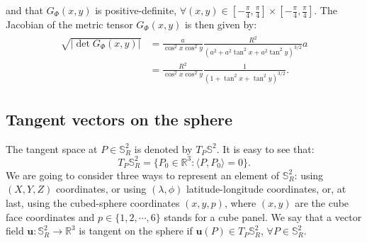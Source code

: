 and that $G_{\Phi}(x,y)$ is positive-definite, 
$\forall (x,y) \in [-\frac{\pi}{4},\frac{\pi}{4}] 
\times [-\frac{\pi}{4},\frac{\pi}{4}]$.
The Jacobian of the metric tensor $G_{\Phi}(x,y)$ is then given by:
\begin{align}
	\label{metrictensor-cs-equiangular}
	\begin{split}
		\sqrt{|\det{G_{\Phi}(x,y)}|} &= \frac{a}{\cos^2 x \cos^2 y}
		\frac{R^2}{(a^2 + a^2\tan^2x + a^2\tan^2y)^{3/2}}a\\
		&= \frac{R^2}{\cos^2 x \cos^2 y}
		\frac{1}{(1 + \tan^2x + \tan^2y)^{3/2}}.
	\end{split}
\end{align}

\subsection{Tangent vectors on the sphere}
\label{cs-tgvectors}
The tangent space at $P \in \mathbb{S}^2_R$ is denoted by $T_P \mathbb{S}^2$.
It is easy to see that:
\begin{equation*}
	T_P\mathbb{S}^2_R = \{P_0 \in \mathbb{R}^3: \langle P,P_0\rangle = 0\}.
\end{equation*}
We are going to consider three ways to represent an element of $\mathbb{S}_R^2$:
using $(X,Y,Z)$ coordinates, or using $(\lambda, \phi)$
latitude-longitude coordinates, or, at last, using the cubed-sphere
coordinates $(x,y,p)$, where $(x,y)$ are the cube face coordinates and 
$p \in \{1,2,\cdots, 6\}$ stands for a cube panel.
We say that a vector field $\boldsymbol{u}: \mathbb{S}^2_R \to 
\mathbb{R}^3$ is tangent on  the sphere if
$\boldsymbol{u}(P) \in T_P\mathbb{S}^2_R$, $\forall P \in \mathbb{S}^2_R$.

